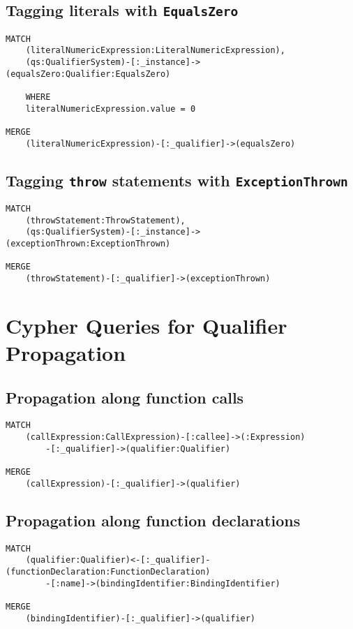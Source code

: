 \subsection[Tagging literals with EqualsZero]{Tagging literals with \lstinline{EqualsZero}}
\begin{lstlisting}[language=Cypher]
MATCH
    (literalNumericExpression:LiteralNumericExpression),
    (qs:QualifierSystem)-[:_instance]->(equalsZero:Qualifier:EqualsZero)

    WHERE
    literalNumericExpression.value = 0

MERGE
    (literalNumericExpression)-[:_qualifier]->(equalsZero)
\end{lstlisting}


\subsection[Tagging throw statements with ExceptionThrown]{Tagging \lstinline{throw} statements with \lstinline{ExceptionThrown}}
\begin{lstlisting}[language=Cypher]
MATCH
    (throwStatement:ThrowStatement),
    (qs:QualifierSystem)-[:_instance]->(exceptionThrown:ExceptionThrown)

MERGE
    (throwStatement)-[:_qualifier]->(exceptionThrown)
\end{lstlisting}


\newpage
\section{Cypher Queries for Qualifier Propagation}

\subsection{Propagation along function calls}
\begin{lstlisting}[language=Cypher]
MATCH
    (callExpression:CallExpression)-[:callee]->(:Expression)
        -[:_qualifier]->(qualifier:Qualifier)

MERGE
    (callExpression)-[:_qualifier]->(qualifier)
\end{lstlisting}


\subsection{Propagation along function declarations}
\begin{lstlisting}[language=Cypher]
MATCH
    (qualifier:Qualifier)<-[:_qualifier]-(functionDeclaration:FunctionDeclaration)
        -[:name]->(bindingIdentifier:BindingIdentifier)

MERGE
    (bindingIdentifier)-[:_qualifier]->(qualifier)
\end{lstlisting}


